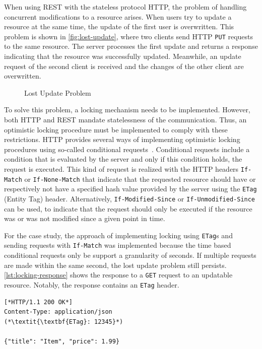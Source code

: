 When using \ac{REST} with the stateless protocol \ac{HTTP}, the problem of handling concurrent modifications to a resource arises.
When users try to update a resource at the same time, the update of the first user is overwritten.
This problem is shown in \autoref{fig:lost-update}, where two clients send \ac{HTTP} \texttt{PUT} requests to the same resource.
The server processes the first update and returns a response indicating that the resource was successfully updated.
Meanwhile, an update request of the second client is received and the changes of the other client are overwritten.

\begin{figure}[!htb]
    \centering
    
    \caption{Lost Update Problem}\label{fig:lost-update}
\end{figure}

To solve this problem, a locking mechanism needs to be implemented.
However, both \ac{HTTP} and \ac{REST} mandate statelessness of the communication.
Thus, an optimistic locking procedure must be implemented to comply with these restrictions.
\ac{HTTP} provides several ways of implementing optimistic locking procedures using so-called conditional requests~\cite{MDN2020}.
Conditional requests include a condition that is evaluated by the server and only if this condition holds, the request is executed.
This kind of request is realized with the \ac{HTTP} headers \texttt{If-Match} or \texttt{If-None-Match} that indicate that the requested resource should have or respectively not have a specified hash value provided by the server using the \texttt{ETag} (Entity Tag) header.
Alternatively, \texttt{If-Modified-Since} or \texttt{If-Unmodified-Since} can be used, to indicate that the request should only be executed if the resource was or was not modified since a given point in time.

For the case study, the approach of implementing locking using \texttt{ETag}s and sending requests with \texttt{If-Match} was implemented because the time based conditional requests only be support a granularity of seconds.
If multiple requests are made within the same second, the lost update problem still persists.
\autoref{lst:locking-response} shows the response to a \texttt{GET} request to an updatable resource.
Notably, the response contains an \texttt{ETag} header.

\begin{lstlisting}[caption={Response to \texttt{GET} Requests for Updatable Resources}, showlines=true, label=lst:locking-response, language=http]
[*HTTP/1.1 200 OK*]
Content-Type: application/json
(*\textit{\textbf{ETag}: 12345}*)

{"title": "Item", "price": 1.99}
\end{lstlisting}

